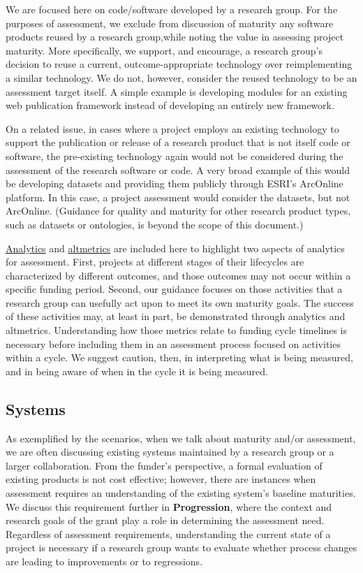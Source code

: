 \documentclass{article}
\begin{document}
We are focused here on code/software developed by a research group. For the purposes of assessment, we exclude from discussion of maturity any software products reused by a research group,while noting the value in assessing project maturity. More specifically, we support, and encourage, a research group’s decision to reuse a current, outcome-appropriate technology over reimplementing a similar technology. We do not, however, consider the reused technology to be an assessment target itself. A simple example is developing modules for an existing web publication framework instead of developing an entirely new framework.
 
On a related issue, in cases where a project employs an existing technology to support the publication or release of a research product that is not itself code or software, the pre-existing technology again would not be considered during the assessment of the research software or code. A very broad example of this would be developing datasets and providing them publicly through ESRI’s ArcOnline platform. In this case, a project assessment would consider the datasets, but not ArcOnline. (Guidance for quality and maturity for other research product types, such as datasets or ontologies, is beyond the scope of this document.)
 
\href{https://www.usability.gov/what-and-why/web-analytics.html} {Analytics} and \href{http://altmetrics.org/manifesto/} {altmetrics} are included here to highlight two aspects of analytics for assessment. First, projects at different stages of their lifecycles are characterized by different outcomes, and those outcomes may not occur within a specific funding period. Second, our guidance focuses on those activities that a research group can usefully act upon to meet its own maturity goals. The success of these activities may, at least in part, be demonstrated through analytics and altmetrics. Understanding how those metrics relate to funding cycle timelines is necessary before including them in an assessment process focused on activities within a cycle. We suggest caution, then, in interpreting what is being measured, and in being aware of when in the cycle it is being measured.

\subsection{Systems}

As exemplified by the scenarios, when we talk about maturity and/or assessment, we are often discussing existing systems maintained by a research group or a larger collaboration. From the funder’s perspective, a formal evaluation of existing products is not cost effective; however, there are instances when assessment requires an understanding of the existing system’s baseline maturities. We discuss this requirement further in \textbf{Progression}, where the context and research goals of the grant play a role in determining the assessment need. Regardless of assessment requirements, understanding the current state of a project is necessary if a research group wants to evaluate whether process changes are leading to improvements or to regressions. 
 
\end{document}
